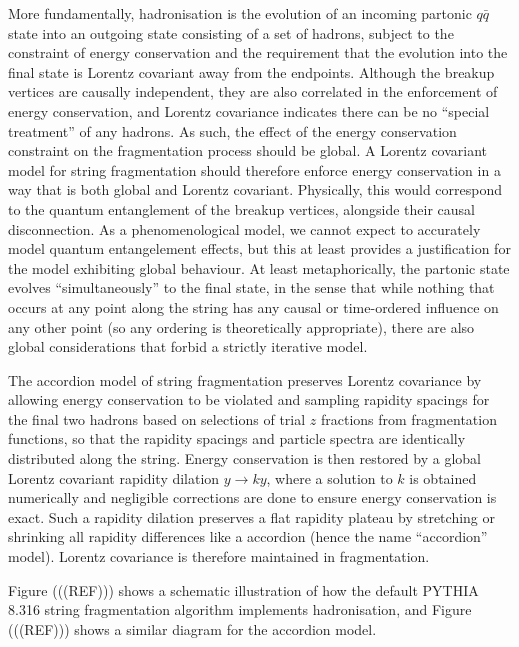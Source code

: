 \documentclass[12pt,a4paper]{report}
\begin{document}
More fundamentally, hadronisation is the evolution of an incoming partonic $q\bar{q}$ state into an outgoing state consisting of a set of hadrons, subject to the constraint of energy conservation and the requirement that the evolution into the final state is Lorentz covariant away from the endpoints. Although the breakup vertices are causally independent, they are also correlated in the enforcement of energy conservation, and Lorentz covariance indicates there can be no ``special treatment'' of any hadrons. As such, the effect of the energy conservation constraint on the fragmentation process should be global. A Lorentz covariant model for string fragmentation should therefore enforce energy conservation in a way that is both global and Lorentz covariant. Physically, this would correspond to the quantum entanglement of the breakup vertices, alongside their causal disconnection. As a phenomenological model, we cannot expect to accurately model quantum entangelement effects, but this at least provides a justification for the model exhibiting global behaviour. At least metaphorically, the partonic state evolves ``simultaneously'' to the final state, in the sense that while nothing that occurs at any point along the string has any causal or time-ordered influence on any other point (so any ordering is theoretically appropriate), there are also global considerations that forbid a strictly iterative model.

The accordion model of string fragmentation preserves Lorentz covariance by allowing energy conservation to be violated and sampling rapidity spacings for the final two hadrons based on selections of trial $z$ fractions from fragmentation functions, so that the rapidity spacings and particle spectra are identically distributed along the string. Energy conservation is then restored by a global Lorentz covariant rapidity dilation $y \rightarrow ky$, where a solution to $k$ is obtained numerically and negligible corrections are done to ensure energy conservation is exact. Such a rapidity dilation preserves a flat rapidity plateau by stretching or shrinking all rapidity differences like a accordion (hence the name ``accordion'' model). Lorentz covariance is therefore maintained in fragmentation.

Figure (((REF))) shows a schematic illustration of how the default PYTHIA 8.316 string fragmentation algorithm implements hadronisation, and Figure (((REF))) shows a similar diagram for the accordion model.
\end{document}

